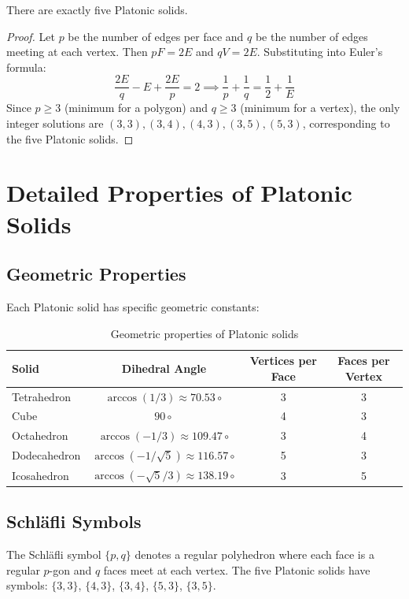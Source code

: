 \begin{theorem}
There are exactly five Platonic solids.
\end{theorem}

\begin{proof}
Let $p$ be the number of edges per face and $q$ be the number of edges meeting at each vertex.
Then $pF = 2E$ and $qV = 2E$. Substituting into Euler's formula:
\[
\frac{2E}{q} - E + \frac{2E}{p} = 2 \implies \frac{1}{p} + \frac{1}{q} = \frac{1}{2} + \frac{1}{E}
\]
Since $p \geq 3$ (minimum for a polygon) and $q \geq 3$ (minimum for a vertex), the only
integer solutions are $(3,3), (3,4), (4,3), (3,5), (5,3)$, corresponding to the five Platonic solids.
\end{proof}

\section{Detailed Properties of Platonic Solids}

\subsection{Geometric Properties}

Each Platonic solid has specific geometric constants:

\begin{table}[H]
\centering
\begin{tabular}{l|c|c|c}
Solid & Dihedral Angle & Vertices per Face & Faces per Vertex \\
\hline
Tetrahedron & $\arccos(1/3) \approx 70.53\circ$ & 3 & 3 \\
Cube & $90\circ$ & 4 & 3 \\
Octahedron & $\arccos(-1/3) \approx 109.47\circ$ & 3 & 4 \\
Dodecahedron & $\arccos(-1/\sqrt{5}) \approx 116.57\circ$ & 5 & 3 \\
Icosahedron & $\arccos(-\sqrt{5}/3) \approx 138.19\circ$ & 3 & 5 \\
\end{tabular}
\caption{Geometric properties of Platonic solids}
\end{table}

\subsection{Schl\"{a}fli Symbols}

The Schl\"{a}fli symbol $\{p,q\}$ denotes a regular polyhedron where each face is a regular $p$-gon
and $q$ faces meet at each vertex. The five Platonic solids have symbols:
$\{3,3\}$, $\{4,3\}$, $\{3,4\}$, $\{5,3\}$, $\{3,5\}$.

